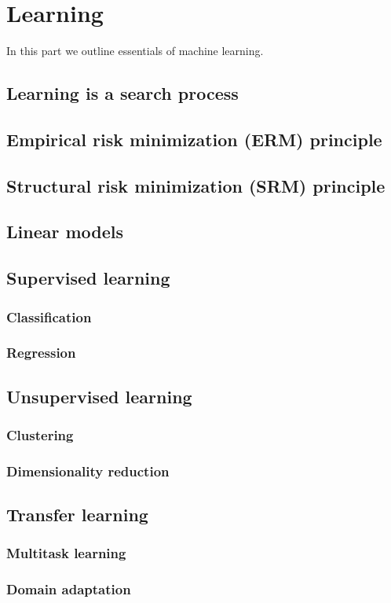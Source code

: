 \chapter{Learning}

In this part we outline essentials of machine learning.

\section{Learning is a search process}

\section{Empirical risk minimization (ERM) principle}

\section{Structural risk minimization (SRM) principle}

\section{Linear models}

\section{Supervised learning}

\subsection{Classification}

\subsection{Regression}

\section{Unsupervised learning}

\subsection{Clustering}

\subsection{Dimensionality reduction}

\section{Transfer learning}

\subsection{Multitask learning}

\subsection{Domain adaptation}
